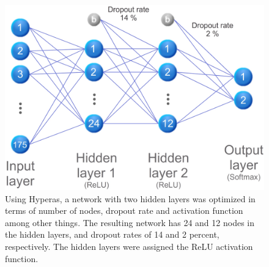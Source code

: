 \begin{figure}[h]
	\centering
	\includegraphics[scale=0.5]{figs_temp/optimized_network_graph.jpg}
	\caption{Using Hyperas, a network with two hidden layers was optimized in terms of number of nodes, dropout rate and activation function among other things. The resulting network has 24 and 12 nodes in the hidden layers, and dropout rates of 14 and 2 percent, respectively. The hidden layers were assigned the ReLU activation function.}
	\label{fig:opt_net}
\end{figure}








